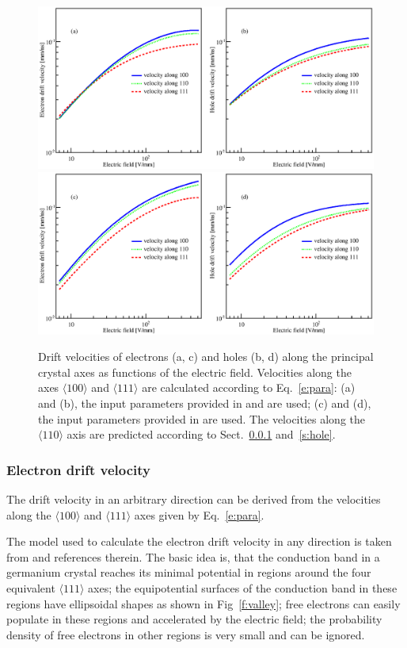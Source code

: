 \documentclass[epj,referee]{svjour}
\begin{document}
\begin{figure}[tb]
\centering
\includegraphics[width=0.8\linewidth]{VvsElucian} 
\includegraphics[width=0.8\linewidth]{VvsEbart} 
\caption{Drift velocities of electrons (a, c) and holes (b, d) along
the principal crystal axes as functions of the electric
field. Velocities along the axes $\langle 100 \rangle$ and $\langle
111 \rangle$ are calculated according to Eq.~\ref{e:para}: (a) and
(b), the input parameters provided in \cite{miha} and \cite{reg} are
used; (c) and (d), the input parameters provided in \cite{bart} are
used. The velocities along the $\langle 110 \rangle$ axis are
predicted according to Sect.~\ref{s:elec} and~\ref{s:hole}.}
\label{f:vvse} 
\end{figure} 

\subsubsection{Electron drift velocity}
\label{s:elec}
The drift velocity in an arbitrary direction can be derived from the
velocities along the $\langle 100 \rangle$ and $\langle 111 \rangle$
axes given by Eq.~\ref{e:para}.

The model used to calculate the electron drift velocity in any
direction is taken from \cite{miha} and references therein. The basic
idea is, that the conduction band in a germanium crystal reaches its
minimal potential in regions around the four equivalent $\langle 111
\rangle$ axes; the equipotential surfaces of the conduction band in
these regions have ellipsoidal shapes as shown in Fig~\ref{f:valley};
free electrons can easily populate in these regions and accelerated by
the electric field; the probability density of free electrons in other
regions is very small and can be ignored.
\end{document}
